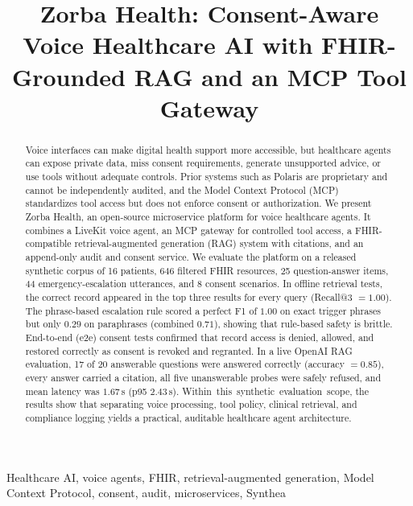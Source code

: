 \documentclass[conference]{IEEEtran}
\newcommand{\chin}[1]{\begingroup\setlength{\fboxsep}{1pt}\colorbox{changehl}{\hbox{#1}}\endgroup}
\begin{document}
\title{Zorba Health: Consent-Aware Voice Healthcare AI with FHIR-Grounded RAG and an MCP Tool Gateway}

\author{}

\maketitle

\begin{abstract}
Voice interfaces can make digital health support more accessible, but healthcare agents can expose private data, miss consent requirements, generate unsupported advice, or use tools without adequate controls.
Prior systems such as Polaris are proprietary and cannot be independently audited, and the Model Context Protocol (MCP) standardizes tool access but does not enforce consent or authorization.
We present Zorba Health, an open-source microservice platform for voice healthcare agents.
It combines a LiveKit voice agent, an MCP gateway for controlled tool access, a FHIR-compatible retrieval-augmented generation (RAG) system with citations, and an append-only audit and consent service.
We evaluate the platform on a released synthetic corpus of 16 patients, 646 filtered FHIR resources, 25 question-answer items, 44 emergency-escalation utterances, and 8 consent scenarios.
In offline retrieval tests, the correct record appeared in the top three results for every query (Recall@3 $= 1.00$).
The phrase-based escalation rule scored a perfect F1 of $1.00$ on exact trigger phrases but only $0.29$ on paraphrases (combined $0.71$), showing that rule-based safety is brittle.
End-to-end (e2e) consent tests confirmed that record access is denied, allowed, and restored correctly as consent is revoked and regranted.
In a live OpenAI RAG evaluation, 17 of 20 answerable questions were answered correctly (accuracy $= 0.85$), every answer carried a citation, all five unanswerable probes were safely refused, and mean latency was $1.67$\,s (p95 $2.43$\,s).
\chin{Within this synthetic evaluation scope,} the results show that separating voice processing, tool policy, clinical retrieval, and compliance logging yields a practical, auditable healthcare agent architecture.
\end{abstract}

\begin{IEEEkeywords}
Healthcare AI, voice agents, FHIR, retrieval-augmented generation, Model Context Protocol, consent, audit, microservices, Synthea
\end{IEEEkeywords}
\end{document}
